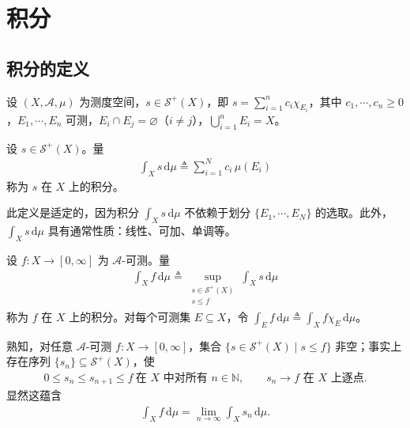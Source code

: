 \documentclass[../../main.tex]{subfiles}%
\begin{document}
\section{积分}\label{section:ch02-积分}

\subsection{积分的定义}\label{subsection:ch02-积分定义}

设 $(X,\mathscr A,\mu)$ 为测度空间，$s\in\mathscr S^+(X)$，即 $s=\sum_{i=1}^n c_i\chi_{E_i}$，其中 $c_1,\cdots ,c_n\geqslant0$，$E_1,\cdots ,E_n$ 可测，$E_i\cap E_j=\varnothing $（$i\neq j$），$\bigcup_{i=1}^n E_i=X$。

\begin{definition}\label{definition:ch02-简单函数积分}
设 $s\in\mathscr S^+(X)$。量
\begin{align*}
\int_X s\,\mathrm{d}\mu\triangleq \sum_{i=1}^N c_i\,\mu(E_i)
\end{align*}
称为 $s$ 在 $X$ 上的积分。
\end{definition}

此定义是适定的，因为积分 $\int_X s\,\mathrm{d}\mu$ 不依赖于划分 $\{E_1,\cdots ,E_N\}$ 的选取。此外，$\int_X s\,\mathrm{d}\mu$ 具有通常性质：线性、可加、单调等。

\begin{definition}\label{definition:ch02-非负可测积分}\label{definition:ch02-Lebesgue}\label{definition:ch02-Lebesgue积分}
设 $f:X\to[0,\infty]$ 为 $\mathscr A$-可测。量
\begin{align}
\int_X f\,\mathrm{d}\mu\triangleq \sup_{\substack{s\in\mathscr S^+(X)\\ s\leqslant f}}\int_X s\,\mathrm{d}\mu \label{align:ch02-2.4}
\end{align}
称为 $f$ 在 $X$ 上的积分。对每个可测集 $E\subseteq X$，令 $\int_E f\,\mathrm{d}\mu\triangleq \int_X f\chi_E\,\mathrm{d}\mu$。
\end{definition}

\begin{remark}\label{remark:ch02-简单逼近积分}
\label{remark:ch02-简单积分}
熟知，对任意 $\mathscr A$-可测 $f:X\to[0,\infty]$，集合 $\{s\in\mathscr S^+(X)\mid s\leqslant f\}$ 非空；事实上存在序列 $\{s_n\}\subseteq\mathscr S^+(X)$，使
\begin{align}
0\leqslant s_n\leqslant s_{n+1}\leqslant f\ \text{在 }X\text{ 中对所有 }n\in\mathbb N,\qquad s_n\to f\text{ 在 }X\text{ 上逐点}. \label{align:ch02-2.5}
\end{align}
显然这蕴含
\begin{align}
\int_X f\,\mathrm{d}\mu=\lim_{n\to\infty}\int_X s_n\,\mathrm{d}\mu. \label{align:ch02-2.6}
\end{align}
\end{remark}
\end{document}
